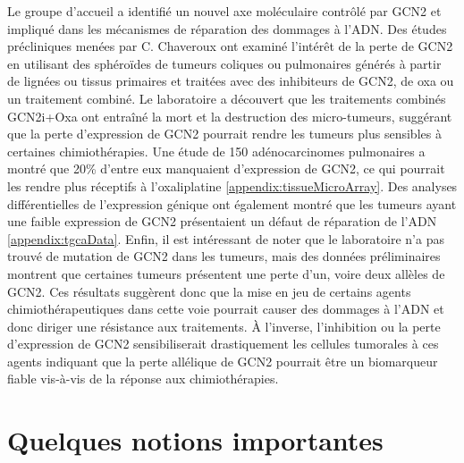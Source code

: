 \documentclass{style}
\begin{document}
Le groupe d’accueil a identifié un nouvel axe moléculaire contrôlé par GCN2 et impliqué dans les mécanismes de réparation des dommages à l’ADN. Des études précliniques menées par C. Chaveroux ont examiné l'intérêt de la perte de GCN2 en utilisant des sphéroïdes de tumeurs coliques ou pulmonaires générés à partir de lignées ou tissus primaires et traitées avec des inhibiteurs de GCN2, de \acrfull{oxa} ou un traitement combiné. Le laboratoire a découvert que les traitements combinés GCN2i+Oxa ont entraîné la mort et la destruction des micro-tumeurs, suggérant que la perte d'expression de GCN2 pourrait rendre les tumeurs plus sensibles à certaines chimiothérapies. Une étude de 150 adénocarcinomes pulmonaires a montré que 20\% d'entre eux manquaient d'expression de GCN2, ce qui pourrait les rendre plus réceptifs à l'oxaliplatine \ref{appendix:tissueMicroArray}. Des analyses différentielles de l'expression génique ont également montré que les tumeurs ayant une faible expression de GCN2 présentaient un défaut de réparation de l'ADN \ref{appendix:tgcaData}. Enfin, il est intéressant de noter que le laboratoire n'a pas trouvé de mutation de GCN2 dans les tumeurs, mais des données préliminaires montrent que certaines tumeurs présentent une perte d'un, voire deux allèles de GCN2. Ces résultats suggèrent donc que la mise en jeu de certains agents chimiothérapeutiques dans cette voie pourrait causer des dommages à l’ADN et donc diriger une résistance aux traitements. À l’inverse, l’inhibition ou la perte d’expression de GCN2 sensibiliserait drastiquement les cellules tumorales à ces agents indiquant que la perte allélique de GCN2 pourrait être un biomarqueur fiable vis-à-vis de la réponse aux chimiothérapies.


\newpage
\section{Quelques notions importantes} \label{section2}
\end{document}
